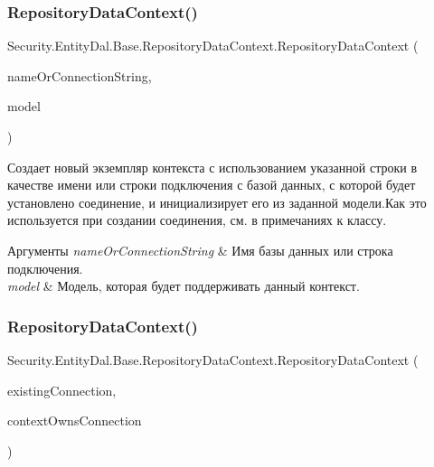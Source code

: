 \subsubsection{\texorpdfstring{Repository\+Data\+Context()}{RepositoryDataContext()}\hspace{0.1cm}{\footnotesize\ttfamily [4/7]}}
{\footnotesize\ttfamily Security.\+Entity\+Dal.\+Base.\+Repository\+Data\+Context.\+Repository\+Data\+Context (\begin{DoxyParamCaption}\item[{string}]{name\+Or\+Connection\+String,  }\item[{Db\+Compiled\+Model}]{model }\end{DoxyParamCaption})\hspace{0.3cm}{\ttfamily [protected]}}



Создает новый экземпляр контекста с использованием указанной строки в качестве имени или строки подключения с базой данных, с которой будет установлено соединение, и инициализирует его из заданной модели.\+Как это используется при создании соединения, см. в примечаниях к классу. 


\begin{DoxyParams}{Аргументы}
{\em name\+Or\+Connection\+String} & Имя базы данных или строка подключения.\\
\hline
{\em model} & Модель, которая будет поддерживать данный контекст.\\
\hline
\end{DoxyParams}
\mbox{\label{class_security_1_1_entity_dal_1_1_base_1_1_repository_data_context_a99df09b09d77220fe39076a525de2008}} 
\subsubsection{\texorpdfstring{Repository\+Data\+Context()}{RepositoryDataContext()}\hspace{0.1cm}{\footnotesize\ttfamily [5/7]}}
{\footnotesize\ttfamily Security.\+Entity\+Dal.\+Base.\+Repository\+Data\+Context.\+Repository\+Data\+Context (\begin{DoxyParamCaption}\item[{Db\+Connection}]{existing\+Connection,  }\item[{bool}]{context\+Owns\+Connection }\end{DoxyParamCaption})\hspace{0.3cm}{\ttfamily [protected]}}



